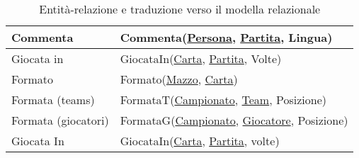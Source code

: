\documentclass{article}
\begin{document}
\begin{table}
\begin{tabularx}{\textwidth}{|l|X|}
        Commenta & Commenta(\underline{Persona}, \underline{Partita}, Lingua) \\ \hline
        Giocata in & GiocataIn(\underline{Carta}, \underline{Partita}, Volte) \\ \hline
        Formato & Formato(\underline{Mazzo}, \underline{Carta}) \\ \hline
        Formata (teams) & FormataT(\underline{Campionato}, \underline{Team}, Posizione) \\ \hline
        Formata (giocatori) & FormataG(\underline{Campionato}, \underline{Giocatore}, Posizione) \\ \hline
        Giocata In & GiocataIn(\underline{Carta}, \underline{Partita}, volte) \\ \hline
    \end{tabularx}
    \caption{Entità-relazione e traduzione verso il modella relazionale}
    \label{table_entita_relazione_traduzione}
\end{table}
\end{document}
